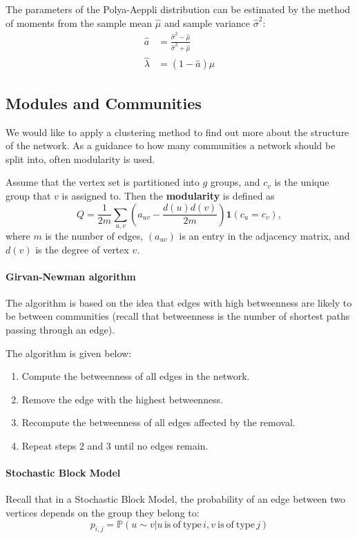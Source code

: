 \documentclass{article}
\begin{document}
The parameters of the Polya-Aeppli distribution can be estimated by the method of moments from the sample mean $\hat{\mu}$ and sample variance $\hat{\sigma}^2$:
\begin{align*}
    \hat{a} &= \frac{\hat{\sigma}^2 - \hat{\mu}}{\hat{\sigma}^2+\hat{\mu}}\\
    \hat{\lambda} &= (1-\hat{a})\hat{\mu}
\end{align*}


\subsection{Modules and Communities}
We would like to apply a clustering method to find out more about the structure of the network. As a guidance to how many communities a network should be split into, often modularity is used.  
\begin{definition}
    Assume that the vertex set is partitioned into \( g \) groups, and
\( c_v \) is the unique group that \( v \) is assigned to. 
Then the \textbf{modularity} is defined as
\[
Q = \frac{1}{2m} \sum_{u,v} \left( a_{uv} - \frac{d(u)d(v)}{2m} \right) \mathbf{1}(c_u= c_v),
\]
where \( m \) is the number of edges, \((a_{uv}) \) is an entry in the adjacency matrix, and \( d(v) \)
is the degree of vertex \( v \).
\end{definition}

\paragraph{Girvan-Newman algorithm} The algorithm is based on the idea that edges with high betweenness are likely to be between communities (recall that betweenness is the number of shortest paths passing through an edge).

The algorithm is given below:
\begin{enumerate}
    \item Compute the betweenness of all edges in the network.
    \item Remove the edge with the highest betweenness.
    \item Recompute the betweenness of all edges affected by the removal.
    \item Repeat steps 2 and 3 until no edges remain.
\end{enumerate}

\paragraph{Stochastic Block Model}
Recall that in a Stochastic Block Model, the probability of an edge between two vertices depends on the group they belong to: 
\begin{equation*}
    p_{i,j}=\mathbb{P}(u\sim v|u\,\mathrm{is~of~type}\,i,v{\mathrm{~is~of~type}}\,j)
\end{equation*}
\end{document}
